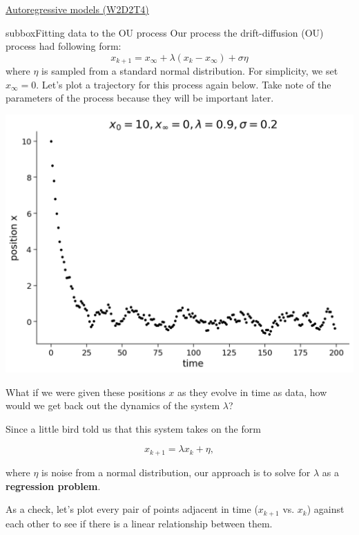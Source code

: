 \begin{textbox}{\href{https://compneuro.neuromatch.io/tutorials/W2D2_LinearSystems/student/W2D2_Tutorial4.html}{Autoregressive models (W2D2T4)} }
\begin{subbox}{subbox}{Fitting data to the OU process}
\scriptsize
 Our process  the drift-diffusion (OU) process had following form:
\[x_{k+1} = x_{\infty} + \lambda(x_k - x_{\infty}) + \sigma \eta\]
where $\eta$ is sampled from a standard normal distribution. 
For simplicity, we set $x_\infty = 0$. Let's plot a trajectory for this process again below. Take note of the parameters of the process because they will be important later.

\begin{center}
\includegraphics[scale=0.16]{Figures/LS/CDS_Figure8.png}
\end{center}
What if we were given these positions $x$ as they evolve in time as data, how would we get back out the dynamics of the system $\lambda$? 

Since a little bird told us that this system takes on the form

$$x_{k+1} = \lambda x_k + \eta,$$

where $\eta$ is noise from a normal distribution, our approach is to solve for $\lambda$ as a \textbf{regression problem}. 

As a check, let's plot every pair of points adjacent in time ($x_{k+1}$ vs. $x_k$) against each other to see if there is a linear relationship between them. 


\end{subbox}
\end{textbox}
